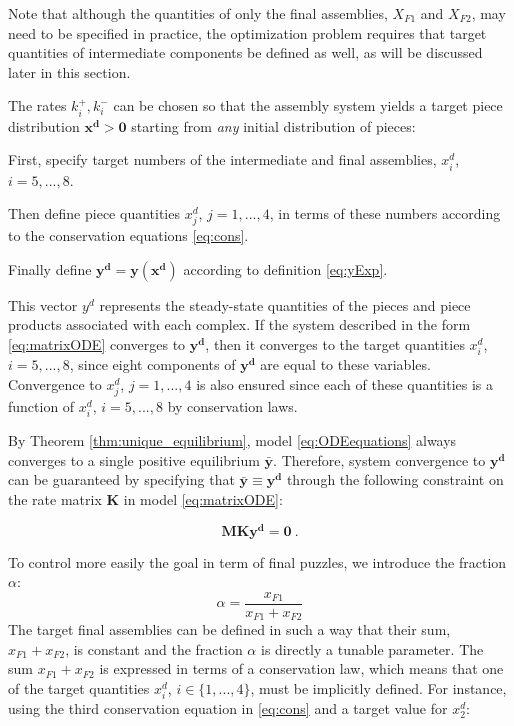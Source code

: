 		Note that although the quantities of only the final
		assemblies, $X_{F1}$ and $X_{F2}$, may need to be specified in
		practice, the optimization problem requires that target quantities
		of intermediate components be defined as well, as will be discussed
		later in this section.

		The rates $k_i^+, k_i^-$ can be chosen so that the assembly system yields a
		target piece distribution $\mathbf{x^d}
		> \mathbf{0}$ starting from {\it any} initial distribution of
		pieces:
		
		\begin{my_enumerate}
			\item First, specify target numbers of the intermediate and final assemblies, $x_i^d$, $i=5,...,8$.
			\item Then define piece quantities $x_j^d$, $j=1,...,4$, in terms of these numbers according to the	conservation equations \eqref{eq:cons}.
			\item Finally define $\mathbf{y^d} = \mathbf{y(x^d)}$ according to definition \eqref{eq:yExp}.
		\end{my_enumerate}
		
		This vector $y^d$ represents the steady-state quantities of the pieces and piece products associated with each complex.
		If the system described in the form \eqref{eq:matrixODE} converges to $\mathbf{y^d}$, then it converges to the
		target quantities $x_i^d$, $i=5,...,8$, since eight components of
		$\mathbf{y^d}$ are equal to these variables. Convergence to $x_j^d$, $j=1,...,4$ is also ensured since each of these quantities is a
		function of $x_i^d$, $i=5,...,8$ by conservation laws.
		
		By Theorem \ref{thm:unique_equilibrium}, model \eqref{eq:ODEequations} always converges to a single positive
		equilibrium $\mathbf{\bar{y}}$. Therefore, system convergence to
		$\mathbf{y^d}$ can be guaranteed by specifying that
		$\mathbf{\bar{y}} \equiv \mathbf{y^d}$ through the following
		constraint on the rate matrix $\mathbf{K}$ in model	\eqref{eq:matrixODE}:
		
		\begin{equation}
			\mathbf{M}\mathbf{K}\mathbf{y^d} = \mathbf{0}~.
			\label{eq:equilConstr}
		\end{equation}

		To control more easily the goal in term of final puzzles, we introduce the fraction $\alpha$:
		\begin{equation} \label{eq:alpha}
			\alpha = \frac{x_{F1}}{x_{F1}+x_{F2}}
		\end{equation}
		The target final assemblies can be defined in such a way that their
		sum, $x_{F1}+x_{F2}$, is constant and the fraction $\alpha$ is directly a tunable parameter. The sum
		$x_{F1}+x_{F2}$ is expressed in terms of a conservation law, which
		means that one of the target quantities $x_i^d$, $i \in
		\{1,...,4\}$, must be implicitly defined. For instance, using the
		third conservation equation in \eqref{eq:cons} and a target
		value for $x_2^d$:

